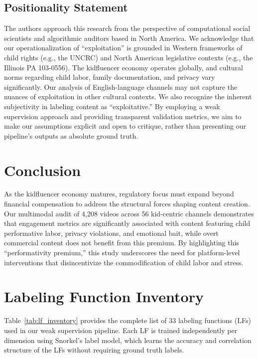 \documentclass[letterpaper]{article} %
\begin{document}
\subsection{Positionality Statement}
The authors approach this research from the perspective of computational social scientists and algorithmic auditors based in North America. We acknowledge that our operationalization of ``exploitation'' is grounded in Western frameworks of child rights (e.g., the UNCRC) and North American legislative contexts (e.g., the Illinois PA 103-0556). The kidfluencer economy operates globally, and cultural norms regarding child labor, family documentation, and privacy vary significantly. Our analysis of English-language channels may not capture the nuances of exploitation in other cultural contexts. We also recognize the inherent subjectivity in labeling content as ``exploitative.'' By employing a weak supervision approach and providing transparent validation metrics, we aim to make our assumptions explicit and open to critique, rather than presenting our pipeline's outputs as absolute ground truth.

\section{Conclusion}

As the kidfluencer economy matures, regulatory focus must expand beyond financial compensation to address the structural forces shaping content creation. Our multimodal audit of 4,208 videos across 56 kid-centric channels demonstrates that engagement metrics are significantly associated with content featuring child performative labor, privacy violations, and emotional bait, while overt commercial content does not benefit from this premium. By highlighting this ``performativity premium,'' this study underscores the need for platform-level interventions that disincentivize the commodification of child labor and stress.



\appendix

\section{Labeling Function Inventory}
\label{app:lfs}

Table~\ref{tab:lf_inventory} provides the complete list of 33 labeling functions (LFs) used in our weak supervision pipeline. Each LF is trained independently per dimension using Snorkel's label model, which learns the accuracy and correlation structure of the LFs without requiring ground truth labels.
\end{document}
